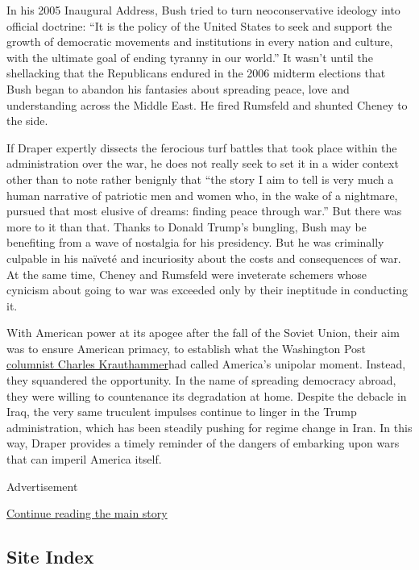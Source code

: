 In his 2005 Inaugural Address, Bush tried to turn neoconservative
ideology into official doctrine: ``It is the policy of the United States
to seek and support the growth of democratic movements and institutions
in every nation and culture, with the ultimate goal of ending tyranny in
our world.'' It wasn't until the shellacking that the Republicans
endured in the 2006 midterm elections that Bush began to abandon his
fantasies about spreading peace, love and understanding across the
Middle East. He fired Rumsfeld and shunted Cheney to the side.

If Draper expertly dissects the ferocious turf battles that took place
within the administration over the war, he does not really seek to set
it in a wider context other than to note rather benignly that ``the
story I aim to tell is very much a human narrative of patriotic men and
women who, in the wake of a nightmare, pursued that most elusive of
dreams: finding peace through war.'' But there was more to it than that.
Thanks to Donald Trump's bungling, Bush may be benefiting from a wave of
nostalgia for his presidency. But he was criminally culpable in his
naïveté and incuriosity about the costs and consequences of war. At the
same time, Cheney and Rumsfeld were inveterate schemers whose cynicism
about going to war was exceeded only by their ineptitude in conducting
it.

With American power at its apogee after the fall of the Soviet Union,
their aim was to ensure American primacy, to establish what the
Washington Post
\href{https://www.nytimes3xbfgragh.onion/2018/06/21/obituaries/charles-krauthammer-prominent-conservative-voice-dies-at-68.html}{columnist
Charles Krauthammer}had called America's unipolar moment. Instead, they
squandered the opportunity. In the name of spreading democracy abroad,
they were willing to countenance its degradation at home. Despite the
debacle in Iraq, the very same truculent impulses continue to linger in
the Trump administration, which has been steadily pushing for regime
change in Iran. In this way, Draper provides a timely reminder of the
dangers of embarking upon wars that can imperil America itself.

Advertisement

\protect\hyperlink{after-bottom}{Continue reading the main story}

\hypertarget{site-index}{%
\subsection{Site Index}\label{site-index}}

